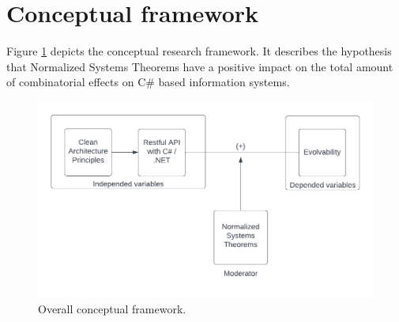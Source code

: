 \section{Conceptual framework} \label{conceptual_framework}
Figure \ref{fig:overall_conceptual_framework} depicts the conceptual research framework.
It describes the hypothesis that Normalized Systems Theorems have a positive impact on the
total amount of combinatorial effects on C\# based information systems.

\begin{figure}[!h]
    \centering
    \includegraphics[width=1\textwidth]{Figures/overall_conceptual_framework}
    \caption[Overall conceptual framework]{Overall conceptual framework.}
    \label{fig:overall_conceptual_framework}
\end{figure}
